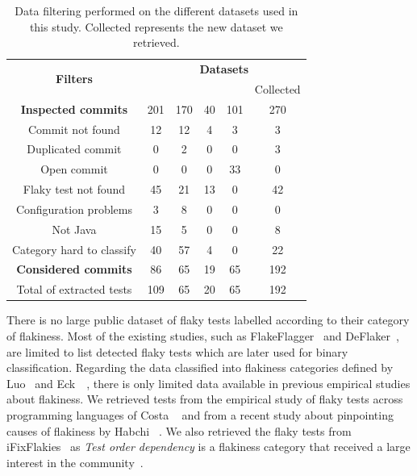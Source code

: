 \begin{table}[htbp]
\centering
\caption{Data filtering performed on the different datasets used in this study. Collected represents the new dataset we retrieved.}
\begin{tabular}{c|c|c|c|c|c}
\toprule 
\multirow{2}{*}{\textbf{Filters}} & \multicolumn{5}{c}{\textbf{Datasets}} \\
\cmidrule{2-6} 
&  \cite{Luo2014} & \cite{across_pr} & \cite{habchiPinpointing} & \cite{Shi2019iFix} & Collected \\ 
\midrule 
\textbf{Inspected commits} & 201 & 170 & 40 & 101 & 270\\ 
 Commit not found  & 12 & 12 & 4 & 3 & 3\\
 Duplicated commit & 0 & 2 & 0 & 0 & 3 \\ 
 Open commit & 0 & 0 & 0 & 33 & 0 \\
Flaky test not found & 45 & 21 & 13 & 0 & 42 \\ 
Configuration problems & 3 & 8 & 0 & 0 & 0\\
Not Java & 15 & 5 & 0 & 0 & 8 \\ 
Category hard to classify & 40 & 57 & 4 & 0 & 22 \\ 
\textbf{Considered commits} & 86 & 65 & 19 &  65 & 192\\
\midrule 
\rowcolor{Gray}
Total of extracted tests & 109 & 65 & 20  & 65 & 192\\
\bottomrule
\end{tabular}
\label{tab:filtring_datasets}
\end{table}


There is no large public dataset of flaky tests labelled according to their category of flakiness. Most of the existing studies, such as FlakeFlagger~\cite{FlakeFlagger} and DeFlaker~\cite{Bell2018}, are limited to list detected flaky tests which are later used for binary classification. 
Regarding the data classified into flakiness categories defined by Luo~\etal \cite{Luo2014} and Eck~\etal~\cite{Eck2019}, there is only limited data available in previous empirical studies about flakiness. We retrieved tests from the empirical study of flaky tests across programming languages of Costa \etal~\cite{across_pr} and from a recent study about pinpointing causes of flakiness by Habchi \etal~\cite{habchiPinpointing}. We also retrieved the flaky tests from iFixFlakies~\cite{Shi2019iFix} as \textit{Test order dependency} is a flakiness category that received a large interest in the community~\cite{li2022evolution,Lam2019iDFlakies,li2022repairing,flake16}.

